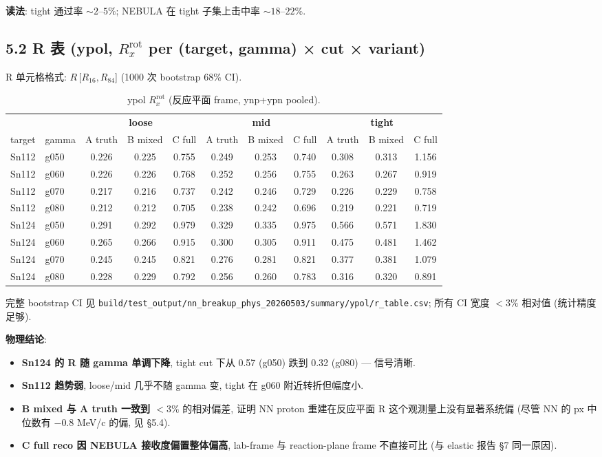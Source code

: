 \documentclass[a4paper,11pt]{article}
\begin{document}
\textbf{读法}: tight 通过率 $\sim 2$--$5\%$; NEBULA 在 tight 子集上击中率 $\sim 18$--$22\%$.

\subsection{5.2 R 表 (ypol, $R_x^\text{rot}$ per (target, gamma) × cut × variant)}

R 单元格格式: $R$\,[$R_{16}, R_{84}$] (1000 次 bootstrap 68\% CI).

\begin{table}[H]
\centering\scriptsize
\caption{ypol $R_x^\text{rot}$ (反应平面 frame, ynp+ypn pooled).}
\begin{tabular}{ll|ccc|ccc|ccc}
\toprule
& & \multicolumn{3}{c|}{\textbf{loose}} & \multicolumn{3}{c|}{\textbf{mid}} & \multicolumn{3}{c}{\textbf{tight}} \\
target & gamma & A truth & B mixed & C full & A truth & B mixed & C full & A truth & B mixed & C full \\
\midrule
Sn112 & g050 & 0.226 & 0.225 & 0.755 & 0.249 & 0.253 & 0.740 & 0.308 & 0.313 & 1.156 \\
Sn112 & g060 & 0.226 & 0.226 & 0.768 & 0.252 & 0.256 & 0.755 & 0.263 & 0.267 & 0.919 \\
Sn112 & g070 & 0.217 & 0.216 & 0.737 & 0.242 & 0.246 & 0.729 & 0.226 & 0.229 & 0.758 \\
Sn112 & g080 & 0.212 & 0.212 & 0.705 & 0.238 & 0.242 & 0.696 & 0.219 & 0.221 & 0.719 \\
Sn124 & g050 & 0.291 & 0.292 & 0.979 & 0.329 & 0.335 & 0.975 & 0.566 & 0.571 & 1.830 \\
Sn124 & g060 & 0.265 & 0.266 & 0.915 & 0.300 & 0.305 & 0.911 & 0.475 & 0.481 & 1.462 \\
Sn124 & g070 & 0.245 & 0.245 & 0.821 & 0.276 & 0.281 & 0.821 & 0.377 & 0.381 & 1.079 \\
Sn124 & g080 & 0.228 & 0.229 & 0.792 & 0.256 & 0.260 & 0.783 & 0.316 & 0.320 & 0.891 \\
\bottomrule
\end{tabular}
\end{table}

完整 bootstrap CI 见 \texttt{build/test\_output/nn\_breakup\_phys\_20260503/summary/ypol/r\_table.csv}; 所有 CI 宽度 $<3\%$ 相对值 (统计精度足够).

\textbf{物理结论}:
\begin{itemize}[nosep]
    \item \textbf{Sn124 的 R 随 gamma 单调下降}, tight cut 下从 0.57 (g050) 跌到 0.32 (g080) — 信号清晰.
    \item \textbf{Sn112 趋势弱}, loose/mid 几乎不随 gamma 变, tight 在 g060 附近转折但幅度小.
    \item \textbf{B mixed 与 A truth 一致到 $<3\%$} 的相对偏差, 证明 NN proton 重建在反应平面 R 这个观测量上没有显著系统偏 (尽管 NN 的 px 中位数有 $-0.8$ MeV/c 的偏, 见 §5.4).
    \item \textbf{C full reco 因 NEBULA 接收度偏置整体偏高}, lab-frame 与 reaction-plane frame 不直接可比 (与 elastic 报告 §7 同一原因).
\end{itemize}
\end{document}
